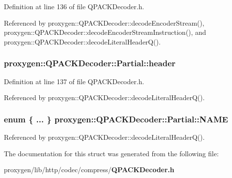 Definition at line 136 of file Q\+P\+A\+C\+K\+Decoder.\+h.



Referenced by proxygen\+::\+Q\+P\+A\+C\+K\+Decoder\+::decode\+Encoder\+Stream(), proxygen\+::\+Q\+P\+A\+C\+K\+Decoder\+::decode\+Encoder\+Stream\+Instruction(), and proxygen\+::\+Q\+P\+A\+C\+K\+Decoder\+::decode\+Literal\+Header\+Q().

\subsubsection[{header}]{ proxygen\+::\+Q\+P\+A\+C\+K\+Decoder\+::\+Partial\+::header}\label{structproxygen_1_1QPACKDecoder_1_1Partial_aa3c3a81fce372938ed831abfb261786b}


Definition at line 137 of file Q\+P\+A\+C\+K\+Decoder.\+h.



Referenced by proxygen\+::\+Q\+P\+A\+C\+K\+Decoder\+::decode\+Literal\+Header\+Q().

\subsubsection[{N\+A\+ME}]{\setlength{\rightskip}{0pt plus 5cm}enum \{ ... \}  proxygen\+::\+Q\+P\+A\+C\+K\+Decoder\+::\+Partial\+::\+N\+A\+ME}\label{structproxygen_1_1QPACKDecoder_1_1Partial_aa5fe69eecdc4430c1148d1c73e25a77c}


Referenced by proxygen\+::\+Q\+P\+A\+C\+K\+Decoder\+::decode\+Literal\+Header\+Q().



The documentation for this struct was generated from the following file\+:\begin{DoxyCompactItemize}
\item 
proxygen/lib/http/codec/compress/{\bf Q\+P\+A\+C\+K\+Decoder.\+h}\end{DoxyCompactItemize}
